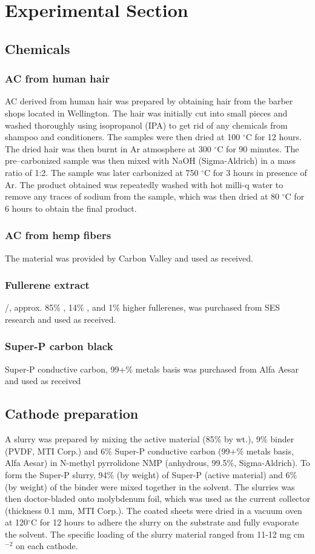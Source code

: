 \documentclass{article}
\begin{document}
\newpage

\section{Experimental Section}
\subsection{Chemicals}
\subsubsection*{AC from human hair}
AC derived from human hair was prepared by obtaining hair from the barber shops located in Wellington. The hair was initially cut into small pieces and washed thoroughly using isopropanol (IPA) to get rid of any chemicals from shampoo and conditioners. The samples were then dried at 100 $^{\circ}$C for 12 hours. The dried hair was then burnt in Ar atmosphere at 300 $^{\circ}$C for 90 minutes. The pre–carbonized sample was then mixed with NaOH (Sigma-Aldrich) in a mass ratio of 1:2. The sample was later carbonized at 750 $^{\circ}$C for 3 hours in presence of Ar. The product obtained was repeatedly washed with hot milli-q water to remove any traces of sodium from the sample, which was then dried at 80 $^{\circ}$C for 6 hours to obtain the final product.

\subsubsection*{AC from hemp fibers}
The material was provided by Carbon Valley and used as received.
\subsubsection*{Fullerene extract}
/, approx. 85\% , 14\% , and 1\% higher fullerenes, was purchased from SES research and used as received.
\subsubsection*{Super-P carbon black}
Super-P conductive carbon, 99+\% metals basis was purchased from Alfa Aesar and used as received

\subsection{Cathode preparation}
A slurry was prepared by mixing the active material (85$\%$ by wt.), 9$\%$ binder (PVDF, MTI Corp.) and 6$\%$ Super-P conductive carbon (99+$\%$ metals basis, Alfa Aesar) in N-methyl pyrrolidone NMP (anhydrous, 99.5$\%$, Sigma-Aldrich). To form the Super-P slurry, 94$\%$ (by weight) of Super-P (active material) and 6$\%$ (by weight) of the binder were mixed together in the solvent. The slurries was then doctor-bladed onto molybdenum foil, which was used as the current collector (thickness 0.1 mm, MTI Corp.). The coated sheets were dried in a vacuum oven at 120$^{\circ}$C for 12 hours to adhere the slurry on the substrate and fully evaporate the solvent. The specific loading of the slurry material ranged from 11-12 mg cm$^{-2}$ on each cathode. 
\end{document}
